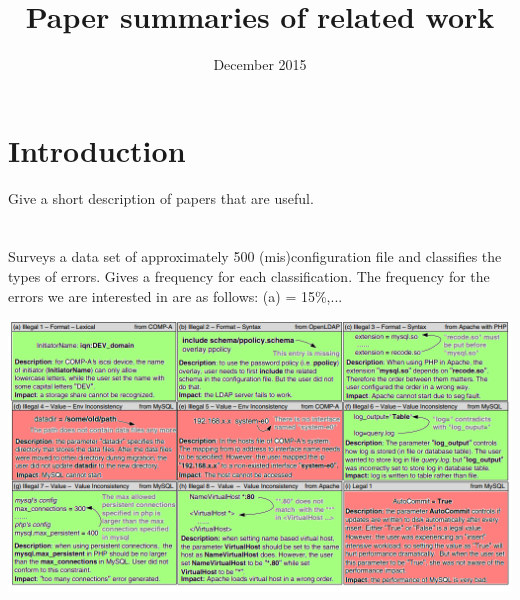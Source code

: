 \documentclass{article}
\title{Paper summaries of related work}
\author{}
\date{December 2015}
\begin{document}
\maketitle

\section{Introduction}
Give a short description of papers that are useful.

\section{\cite{yin2011}}
Surveys a data set of approximately 500 (mis)configuration file and classifies the types of errors. 
Gives a frequency for each classification.
The frequency for the errors we are interested in are as follows: (a) = 15\%,...

\includegraphics[width=\textwidth]{configErrors.png}



\end{document}
